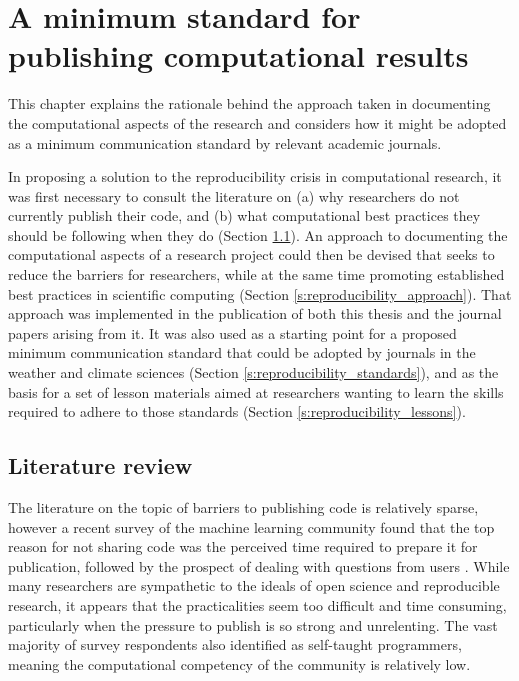 
\chapter{A minimum standard for publishing computational results}\label{c:reproducibility}


\begin{synopsis}
This chapter explains the rationale behind the approach taken in documenting the computational aspects of the research and considers how it might be adopted as a minimum communication standard by relevant academic journals.
\vspace{1cm}
\end{synopsis}



In proposing a solution to the reproducibility crisis in computational research, it was first necessary to consult the literature on (a) why researchers do not currently publish their code, and (b) what computational best practices they should be following when they do (Section \ref{s:reproducibility_review}). An approach to documenting the computational aspects of a research project could then be devised that seeks to reduce the barriers for researchers, while at the same time promoting established best practices in scientific computing (Section \ref{s:reproducibility_approach}). That approach was implemented in the publication of both this thesis and the journal papers arising from it. It was also used as a starting point for a proposed minimum communication standard that could be adopted by journals in the weather and climate sciences (Section \ref{s:reproducibility_standards}), and as the basis for a set of lesson materials aimed at researchers wanting to learn the skills required to adhere to those standards (Section \ref{s:reproducibility_lessons}). 



\section{Literature review}\label{s:reproducibility_review}

The literature on the topic of barriers to publishing code is relatively sparse, however a recent survey of the machine learning community found that the top reason for not sharing code was the perceived time required to prepare it for publication, followed by the prospect of dealing with questions from users \citep{Stodden2010}. While many researchers are sympathetic to the ideals of open science and reproducible research, it appears that the practicalities seem too difficult and time consuming, particularly when the pressure to publish is so strong and unrelenting. The vast majority of survey respondents also identified as self-taught programmers, meaning the computational competency of the community is relatively low. 

